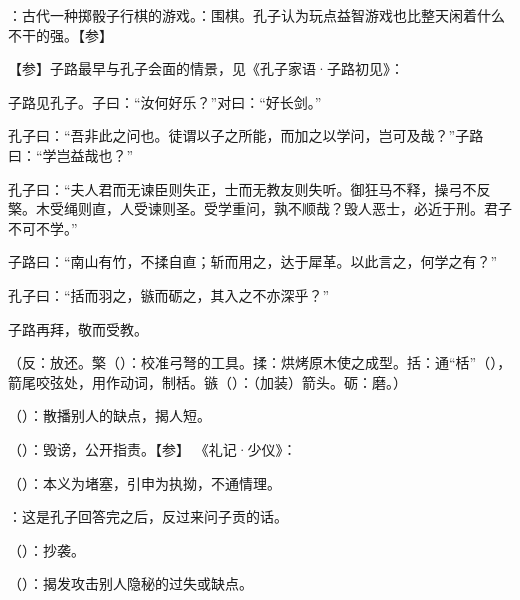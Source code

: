 {
\item {}：古代一种掷骰子行棋的游戏。：围棋。孔子认为玩点益智游戏也比整天闲着什么不干的强。【参】
}
{}  %


{
【参】子路最早与孔子会面的情景，见《孔子家语·子路初见》：
\begin{lyquotepara}
子路见孔子。子曰：“汝何好乐？”对曰：“好长剑。”

孔子曰：“吾非此之问也。徒谓以子之所能，而加之以学问，岂可及哉？”子路曰：“学岂益哉也？”

孔子曰：“夫人君而无谏臣则失正，士而无教友则失听。御狂马不释，操弓不反檠。木受绳则直，人受谏则圣。受学重问，孰不顺哉？毁人恶士，必近于刑。君子不可不学。”

子路曰：“南山有竹，不揉自直；斩而用之，达于犀革。以此言之，何学之有？”

孔子曰：“括而羽之，镞而砺之，其入之不亦深乎？”

子路再拜，敬而受教。
\end{lyquotepara}
（反：放还。檠（）：校准弓弩的工具。揉：烘烤原木使之成型。括：通“栝”（），箭尾咬弦处，用作动词，制栝。镞（）：（加装）箭头。砺：磨。）
}
{}


{
\item {}（）：散播别人的缺点，揭人短。
\item {}（）：毁谤，公开指责。【参】 《礼记·少仪》：
\item {}（）：本义为堵塞，引申为执拗，不通情理。
\item {}：这是孔子回答完之后，反过来问子贡的话。
\item {}（）：抄袭。
\item {}（）：揭发攻击别人隐秘的过失或缺点。
}
{}


